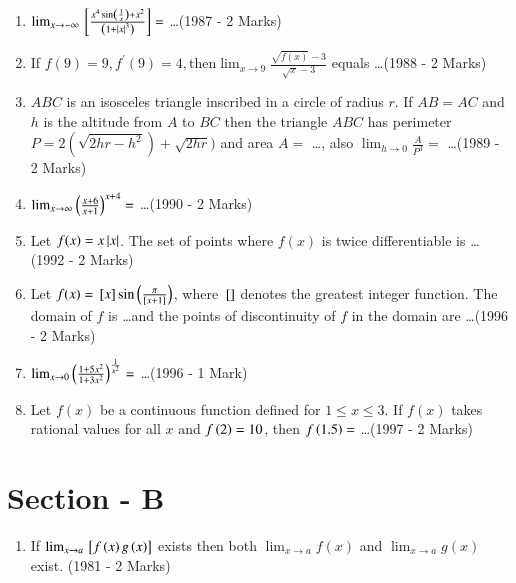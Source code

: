 \documentclass[journal]{IEEEtran}
\begin{document}
\begin{enumerate}
\item {
    $\lim_{x\to-\infty}{}\left[\frac{x^4 \sin \left(\frac{1}{x}\right) + x^2}{\left(1 + \left\vert x\right\vert^3\right)}\right] =$ \ldots \hfill (1987 - 2 Marks)
}\\

\item {
    If $f(9)=9, f^{\prime}(9)=4, \text{then} \lim_{x\to9}\frac{\sqrt{f(x)}-3 }{\sqrt{x}-3}$ equals \ldots \hfill (1988 - 2 Marks)
}\\

\item{
    $ABC$ is an isosceles triangle inscribed in a circle of radius $r$. If $AB = AC$ and $h$ is the altitude from $A$ to $BC$ then the triangle $ABC$ has perimeter $P=2(\sqrt{2hr-h^2})+\sqrt{2hr})$ and area $A=$ \ldots , also $\lim_{h\to0} \frac{A}{P^3} = $ \ldots \hfill (1989 - 2 Marks)
}\\

\item {
    $\lim_{x\to\infty}\left(\frac{x+6}{x +1}\right)^{x+4} =$ \ldots \hfill (1990 - 2 Marks)
}\\

\item{
    Let $f(x) = x\left\vert x\right\vert$. The set of points where $f(x)$ is twice differentiable is \ldots \hfill (1992 - 2 Marks)
}\\

\item{
    Let $f(x)= {}\left[x\right] \sin\left(\frac{\pi}{{}\left[x+1\right]}\right)$, where ${}\left[\right]$ denotes the greatest integer function. The domain of $f$ is \ldots and the points of discontinuity of $f$ in the domain are \ldots \hfill (1996 - 2 Marks)
}\\

\item{
    $\lim_{x\to0} \left(\frac{1+5x^2}{1+3x^2}\right)^{\frac{1}{x^2}} =$ \ldots \hfill (1996 - 1 Mark)
}\\

\item{
    Let $f(x)$ be a continuous function defined for $1 \leq x \leq 3$. If $f(x)$ takes rational values for all $x$ and $f\left(2\right) = 10$, then $f\left(1.5\right) = $ \ldots \hfill (1997 - 2 Marks)
}\\
    
\end{enumerate}

\section*{Section - B}
\begin{enumerate}
	\item{
 If $\lim_{x\to a}{}\left[f\left(x\right)g\left(x\right)\right]$ exists then both $\lim_{x\to a}f(x)$ and $\lim_{x\to a}g(x)$ exist. \hfill (1981 - 2 Marks)
}
\end{enumerate}
\end{document}
